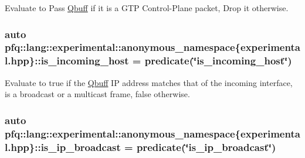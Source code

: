 Evaluate to {\ttfamily Pass} \hyperlink{structpfq_1_1lang_1_1Qbuff}{Qbuff} if it is a G\+TP Control-\/\+Plane packet, {\ttfamily Drop} it otherwise. 

\subsubsection[{\texorpdfstring{is\+\_\+incoming\+\_\+host}{is_incoming_host}}]{\setlength{\rightskip}{0pt plus 5cm}auto pfq\+::lang\+::experimental\+::anonymous\+\_\+namespace\{experimental.\+hpp\}\+::is\+\_\+incoming\+\_\+host = {\bf predicate}(\char`\"{}is\+\_\+incoming\+\_\+host\char`\"{})}\hypertarget{namespacepfq_1_1lang_1_1experimental_1_1anonymous__namespace_02experimental_8hpp_03_aa75d253ac688edcdbfc80160eba5678e}{}\label{namespacepfq_1_1lang_1_1experimental_1_1anonymous__namespace_02experimental_8hpp_03_aa75d253ac688edcdbfc80160eba5678e}


Evaluate to {\ttfamily true} if the \hyperlink{structpfq_1_1lang_1_1Qbuff}{Qbuff} IP address matches that of the incoming interface, is a broadcast or a multicast frame, {\ttfamily false} otherwise. 

\subsubsection[{\texorpdfstring{is\+\_\+ip\+\_\+broadcast}{is_ip_broadcast}}]{\setlength{\rightskip}{0pt plus 5cm}auto pfq\+::lang\+::experimental\+::anonymous\+\_\+namespace\{experimental.\+hpp\}\+::is\+\_\+ip\+\_\+broadcast = {\bf predicate}(\char`\"{}is\+\_\+ip\+\_\+broadcast\char`\"{})}\hypertarget{namespacepfq_1_1lang_1_1experimental_1_1anonymous__namespace_02experimental_8hpp_03_a2d9128841747bf619fdf6ea411ee35e4}{}\label{namespacepfq_1_1lang_1_1experimental_1_1anonymous__namespace_02experimental_8hpp_03_a2d9128841747bf619fdf6ea411ee35e4}


